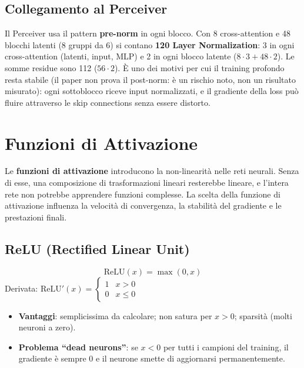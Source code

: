 \documentclass[
  11pt,
]{article}
\begin{document}
\subsection{Collegamento al Perceiver}

\begin{notabox}[title={\textbf{Layer Normalization nel Perceiver}}]
Il Perceiver usa il pattern \textbf{pre-norm} in ogni blocco. Con 8 cross-attention e 48 blocchi latenti (8 gruppi da 6) si contano \textbf{120 Layer Normalization}: 3 in ogni cross-attention (latenti, input, MLP) e 2 in ogni blocco latente ($8 \cdot 3 + 48 \cdot 2$). Le somme residue sono 112 ($56 \cdot 2$). È uno dei motivi per cui il training profondo resta stabile (il paper non prova il post-norm: è un rischio noto, non un risultato misurato): ogni sottoblocco riceve input normalizzati, e il gradiente della loss può fluire attraverso le skip connections senza essere distorto.
\end{notabox}

\section{Funzioni di Attivazione}
\label{app:activations}

Le \textbf{funzioni di attivazione} introducono la non-linearità nelle reti neurali. Senza di esse, una composizione di trasformazioni lineari resterebbe lineare, e l'intera rete non potrebbe apprendere funzioni complesse. La scelta della funzione di attivazione influenza la velocità di convergenza, la stabilità del gradiente e le prestazioni finali.

\subsection{ReLU (Rectified Linear Unit)}

\begin{formulabox}[title={\textbf{ReLU}}]
\[
\text{ReLU}(x) = \max(0, x)
\]
Derivata: $\text{ReLU}'(x) = \begin{cases} 1 & x > 0 \\ 0 & x \leq 0 \end{cases}$
\end{formulabox}

\begin{itemize}
  \item \textbf{Vantaggi}: semplicissima da calcolare; non satura per $x > 0$; sparsità (molti neuroni a zero).
  \item \textbf{Problema ``dead neurons''}: se $x < 0$ per tutti i campioni del training, il gradiente è sempre 0 e il neurone smette di aggiornarsi permanentemente.
\end{itemize}
\end{document}
